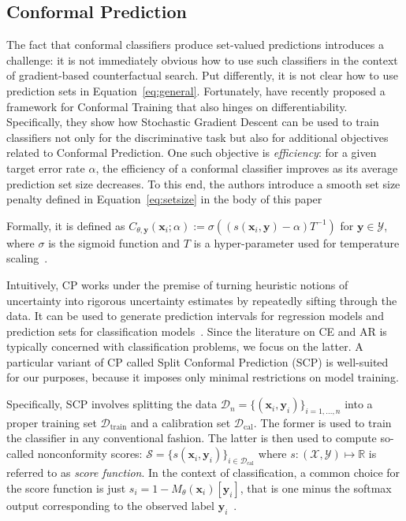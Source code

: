 \documentclass{article}
\begin{document}
\subsection{Conformal Prediction}\label{app-cp}

The fact that conformal classifiers produce set-valued predictions introduces a challenge: it is not immediately obvious how to use such classifiers in the context of gradient-based counterfactual search. Put differently, it is not clear how to use prediction sets in Equation~\ref{eq:general}. Fortunately, \citet{stutz2022learning} have recently proposed a framework for Conformal Training that also hinges on differentiability. Specifically, they show how Stochastic Gradient Descent can be used to train classifiers not only for the discriminative task but also for additional objectives related to Conformal Prediction. One such objective is \textit{efficiency}: for a given target error rate $\alpha$, the efficiency of a conformal classifier improves as its average prediction set size decreases. To this end, the authors introduce a smooth set size penalty defined in Equation~\ref{eq:setsize} in the body of this paper

Formally, it is defined as $C_{\theta,\mathbf{y}}(\mathbf{x}_i;\alpha):=\sigma\left((s(\mathbf{x}_i,\mathbf{y})-\alpha) T^{-1}\right)$ for $\mathbf{y}\in\mathcal{Y}$, where $\sigma$ is the sigmoid function and $T$ is a hyper-parameter used for temperature scaling~\citep{stutz2022learning}.

Intuitively, CP works under the premise of turning heuristic notions of uncertainty into rigorous uncertainty estimates by repeatedly sifting through the data. It can be used to generate prediction intervals for regression models and prediction sets for classification models~\citep{altmeyer2022conformal}. Since the literature on CE and AR is typically concerned with classification problems, we focus on the latter. A particular variant of CP called Split Conformal Prediction (SCP) is well-suited for our purposes, because it imposes only minimal restrictions on model training. 

Specifically, SCP involves splitting the data $\mathcal{D}_n=\{(\mathbf{x}_i,\mathbf{y}_i)\}_{i=1,...,n}$ into a proper training set $\mathcal{D}_{\text{train}}$ and a calibration set $\mathcal{D}_{\text{cal}}$. The former is used to train the classifier in any conventional fashion. The latter is then used to compute so-called nonconformity scores: $\mathcal{S}=\{s(\mathbf{x}_i,\mathbf{y}_i)\}_{i \in \mathcal{D}_{\text{cal}}}$ where $s: (\mathcal{X},\mathcal{Y}) \mapsto \mathbb{R}$ is referred to as \textit{score function}. In the context of classification, a common choice for the score function is just $s_i=1-M_{\theta}(\mathbf{x}_i)[\mathbf{y}_i]$, that is one minus the softmax output corresponding to the observed label $\mathbf{y}_i$~\citep{angelopoulos2021gentle}. 
\end{document}
